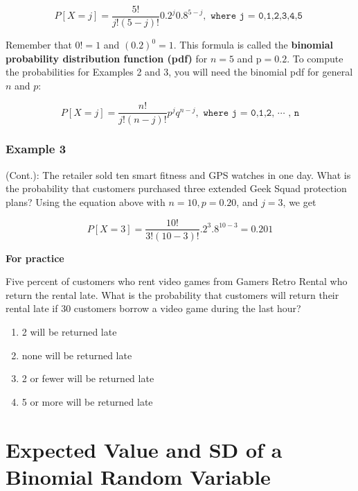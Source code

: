 \documentclass[11pt]{book}\usepackage[]{graphicx}\usepackage[]{color}
\begin{document}
\begin{equation*}
 P[ X = j] = \frac{5!}{j! (5 - j)!} 0.2^j 0.8^{5 - j}, \texttt{ where j = 0,1,2,3,4,5 }
 \end{equation*}

Remember that $0! = 1$ and $(0.2)^0 = 1$.  This formula is called the \textbf{binomial probability distribution function (pdf)} for $n = 5$ and p$ = 0.2$.  To compute the probabilities for Examples 2 and 3, you will need the binomial pdf for general $n$ and $p$:

\begin{equation*}
 P[ X = j] = \frac{n!}{j! (n - j)!} p^j q^{n - j}, \texttt{ where j = 0,1,2, $\cdots$ , n}
 \end{equation*}


\subsubsection{Example 3} (Cont.):  The retailer sold ten smart fitness and GPS watches in one day.  What is the probability that customers purchased three extended Geek Squad protection plans?  Using the equation above with $n = 10, p = 0.20$, and $j = 3$, we get

\begin{equation*}
 P[ X = 3] = \frac{10!}{3! (10 - 3)!} .2^3 .8^{10 - 3} = 0.201
 \end{equation*}

\begin{minipage}[ht]{29mm}

\textbf{For practice}
\end{minipage}
\begin{minipage}[ht]{119mm}

Five percent of customers who rent video games from Gamers Retro Rental who return the rental late.  What is the probability that customers will return their rental late if 30 customers borrow a video game during the last hour?

\begin{enumerate}
\item 2 will be returned late
\item none will be returned late
\item 2 or fewer will be returned late
\item 5 or more will be returned late
\end{enumerate}
\end{minipage}

\section{Expected Value and SD of a Binomial Random Variable}
\end{document}
